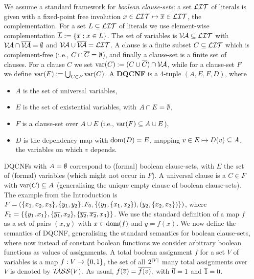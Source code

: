 \documentclass[conference]{IEEEtran}
\begin{document}
We assume a standard framework for \emph{boolean clause-sets}: a set $\mathcal{LIT}$ of literals is given with a fixed-point free involution $x \in \mathcal{LIT} \mapsto \overline x \in \mathcal{LIT}$, the complementation. For a set $L \subseteq \mathcal{LIT}$ of literals we use element-wise complementation $\overline{L} := \{ \overline x : x \in L \}$. The set of variables is $\mathcal{V\hspace{-0.1em}A} \subseteq \mathcal{LIT}$ with $\mathcal{V\hspace{-0.1em}A} \cap \overline{\mathcal{V\hspace{-0.1em}A}} = \emptyset$ and $\mathcal{V\hspace{-0.1em}A} \cup \overline{\mathcal{V\hspace{-0.1em}A}} = \mathcal{LIT}$. A clause is a finite subset $C \subseteq \mathcal{LIT}$ which is complement-free (i.e., $C \cap \overline{C} = \emptyset$), and finally a clause-set is a finite set of clauses. For a clause $C$ we set $\operatorname{var}(C) := (C \cup \overline C) \cap \mathcal{V\hspace{-0.1em}A}$, while for a clause-set $F$ we define $\operatorname{var}(F) := \bigcup_{C \in F} \operatorname{var}(C)$.
A \textbf{DQCNF} is a 4-tuple $(A,E,F,D)$, where
\begin{itemize}
\item $A$ is the set of universal variables,
\item $E$ is the set of existential variables, with $A \cap E = \emptyset$,
\item $F$ is a clause-set over $A \cup E$ (i.e., $\operatorname{var}(F) \subseteq A \cup E$),
\item $D$ is the dependency-map with $\operatorname{dom}(D) = E$, mapping $v \in E \mapsto D(v) \subseteq A$, the variables on which $v$ depends.
\end{itemize}
DQCNFs with $A = \emptyset$ correspond to (formal) boolean clause-sets, with $E$ the set of (formal) variables (which might not occur in $F$).
A universal clause is a $C \in F$ with $\operatorname{var}(C) \subseteq A$ (generalising the unique empty clause of boolean clause-sets).
The example from the Introduction is $F = (\{ x_1,x_2,x_3 \},\{ y_1,y_2 \},F_0,\{ (y_1,\{ x_1,x_2 \}),(y_2,\{ x_2,x_3 \}) \})$, where $F_0 = \{ \{ y_1,x_1 \},\{ \overline{y_1},x_2 \},\{ \overline{y_2},\overline{x_2},x_3 \} \}$.
We use the standard definition of a map $f$ as a set of pairs $(x,y)$ with $x \in \operatorname{dom}(f)$ and $y = f(x)$.
We now define the semantics of DQCNF, generalising the standard semantics for boolean clause-sets, where now instead of constant boolean functions we consider arbitrary boolean functions as values of assignments.
A total boolean assignment $f$ for a set $V$ of variables is a map $f: V \rightarrow \{ 0,1 \}$, the set of all $2^{\lvert V \rvert}$ many total assignments over $V$ is denoted by $\mathcal{T\hspace{-0.35em}ASS}(V)$.
As usual, $f(\overline v) = \overline{f(v)}$, with $\overline 0 = 1$ and $\overline 1 = 0$.
\end{document}
